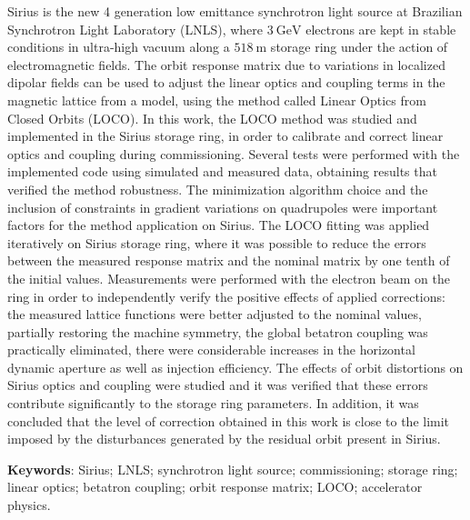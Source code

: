\begin{resumo}
\renewcommand{\sfdefault}{\rmdefault}
    Sirius is the new 4 generation low emittance synchrotron light source at Brazilian Synchrotron Light Laboratory (LNLS), where $\SI{3}{\giga\electronvolt}$ electrons are kept in stable conditions in ultra-high vacuum along a $\SI{518}{\meter}$ storage ring under the action of electromagnetic fields. The orbit response matrix due to variations in localized dipolar fields can be used to adjust the linear optics and coupling terms in the magnetic lattice from a model, using the method called Linear Optics from Closed Orbits (LOCO). In this work, the LOCO method was studied and implemented in the Sirius storage ring, in order to calibrate and correct linear optics and coupling during commissioning. Several tests were performed with the implemented code using simulated and measured data, obtaining results that verified the method robustness. The minimization algorithm choice and the inclusion of constraints in gradient variations on quadrupoles were important factors for the method application on Sirius. The LOCO fitting was applied iteratively on Sirius storage ring, where it was possible to reduce the errors between the measured response matrix and the nominal matrix by one tenth of the initial values. Measurements were performed with the electron beam on the ring in order to independently verify the positive effects of applied corrections: the measured lattice functions were better adjusted to the nominal values, partially restoring the machine symmetry, the global betatron coupling was practically eliminated, there were considerable increases in the horizontal dynamic aperture as well as injection efficiency. The effects of orbit distortions on Sirius optics and coupling were studied and it was verified that these errors contribute significantly to the storage ring parameters. In addition, it was concluded that the level of correction obtained in this work is close to the limit imposed by the disturbances generated by the residual orbit present in Sirius.
    
    \vspace{\onelineskip}
    \noindent\textbf{Keywords}: Sirius; LNLS; synchrotron light source; commissioning; storage ring; linear optics; betatron coupling; orbit response matrix; LOCO; accelerator physics.
    \vspace{\fill}
\end{resumo}

\renewcommand{\sfdefault}{\rmdefault}
\listoffigures*
\cleardoublepage


\renewcommand{\sfdefault}{\rmdefault}
\listoftables*
\cleardoublepage

\renewcommand{\sfdefault}{\rmdefault}
\printglossaries
\cleardoublepage


\renewcommand{\sfdefault}{\rmdefault}
\tableofcontents*
\cleardoublepage
